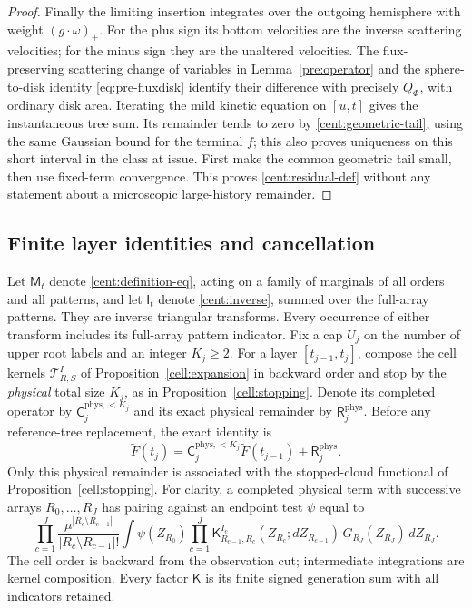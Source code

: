 \begin{proof}
Finally the limiting insertion integrates over the outgoing
hemisphere with weight $(g\cdot\omega)_+$. For the plus sign its bottom
velocities are the inverse scattering velocities; for the minus sign
they are the unaltered velocities. The flux-preserving scattering
change of variables in Lemma~\ref{pre:operator} and the sphere-to-disk
identity \eqref{eq:pre-fluxdisk} identify their difference with precisely
$Q_\Phi$, with ordinary disk area. Iterating the mild kinetic equation
on $[u,t]$ gives the instantaneous tree sum. Its remainder tends to
zero by \eqref{cent:geometric-tail}, using the same Gaussian bound for
the terminal $f$; this also proves uniqueness on this short interval
in the class at issue. First make the common geometric tail small,
then use fixed-term convergence. This proves
\eqref{cent:residual-def} without any statement about a microscopic
large-history remainder.
\end{proof}

\subsection{Finite layer identities and cancellation}

Let $\mathsf M_t$ denote \eqref{cent:definition-eq}, acting on a family
of marginals of all orders and all patterns, and let $\mathsf I_t$
denote \eqref{cent:inverse}, summed over the full-array patterns.
They are inverse triangular transforms. Every occurrence of either
transform includes its full-array pattern indicator.
Fix a cap $U_j$ on the number of upper root labels and an integer
$K_j\geq2$. For a layer $[t_{j-1},t_j]$, compose the cell kernels
$\mathcal T^I_{R,S}$ of Proposition~\ref{cell:expansion} in backward
order and stop by the \emph{physical} total size $K_j$, as in
Proposition~\ref{cell:stopping}. Denote its completed operator by
$\mathsf C_j^{\mathrm{phys},<K_j}$ and its exact physical remainder
by $\mathsf R_j^{\mathrm{phys}}$. Before any reference-tree
replacement, the exact identity is
\begin{equation}\label{cent:physical-layer}
 \widetilde F(t_j)
 =\mathsf C_j^{\mathrm{phys},<K_j}\widetilde F(t_{j-1})
   +\mathsf R_j^{\mathrm{phys}}.
\end{equation}
Only this physical remainder is associated with the stopped-cloud
functional of Proposition~\ref{cell:stopping}.
For clarity, a completed physical term with successive arrays
$R_0,\ldots,R_J$ has pairing against an endpoint test $\psi$ equal to
\begin{equation}\label{cent:layer-kernel}
 \prod_{c=1}^J\frac{\mu^{|R_c\setminus R_{c-1}|}}
                         {|R_c\setminus R_{c-1}|!}
 \int \psi(Z_{R_0})
 \prod_{c=1}^J
 \mathsf K^{I_c}_{R_{c-1},R_c}
          (Z_{R_c};dZ_{R_{c-1}})\,G_{R_J}(Z_{R_J})\,dZ_{R_J}.
\end{equation}
The cell order is backward from the observation cut; intermediate
integrations are kernel composition. Every factor $\mathsf K$ is
its finite signed generation sum with all indicators retained.


